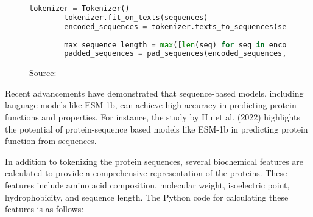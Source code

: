\begin{figure}[bht]
    \begin{lstlisting}[language=Python]
        tokenizer = Tokenizer()
        tokenizer.fit_on_texts(sequences)
        encoded_sequences = tokenizer.texts_to_sequences(sequences)
        
        max_sequence_length = max([len(seq) for seq in encoded_sequences])
        padded_sequences = pad_sequences(encoded_sequences, maxlen=max_sequence_length, padding="post")
\end{lstlisting}
\caption{Source: \autocite{polleyTobiasPolDeepZyme2024}}
\end{figure}

Recent advancements have demonstrated that sequence-based models, including language models like ESM-1b, can achieve high accuracy in predicting protein functions and properties. For instance, the study by Hu et al. (2022) highlights the potential of protein-sequence based models like ESM-1b in predicting protein function from sequences. \autocite{huExploringEvolutionbasedFree2022}

In addition to tokenizing the protein sequences, several biochemical features are calculated to provide a comprehensive representation of the proteins. These features include amino acid composition, molecular weight, isoelectric point, hydrophobicity, and sequence length. The Python code for calculating these features is as follows:

